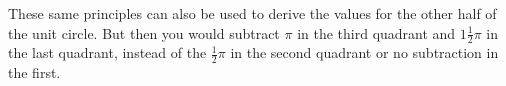 \documentclass[preview]{standalone}
\begin{document}
\begin{center}
These same principles can also be used to derive the values for the other half of the unit circle. But then you would subtract $\pi$ in the third quadrant and $1 \frac{1}{2} \pi$ in the last quadrant, instead of the $\frac{1}{2} \pi$ in the second quadrant or no subtraction in the first.
\end{center}
\end{document}
